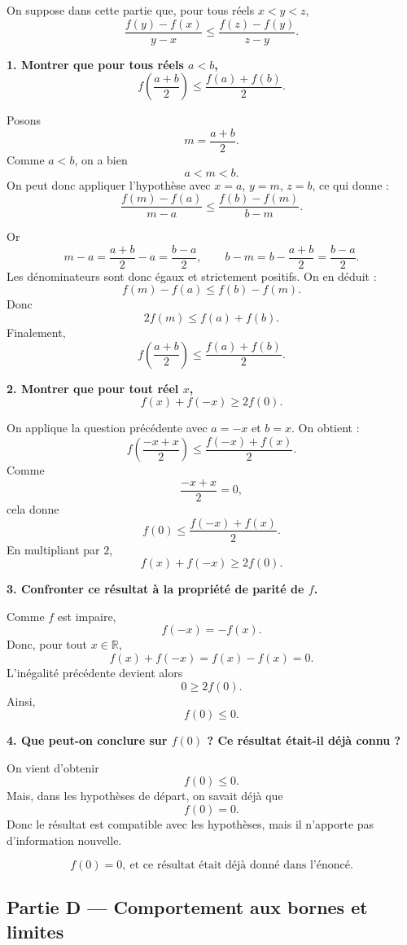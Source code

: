 \documentclass[11pt,a4paper]{article}
\newcommand{\R}{\mathbb{R}}
\begin{document}
On suppose dans cette partie que, pour tous réels \(x<y<z\),
\[
\frac{f(y)-f(x)}{y-x}\le \frac{f(z)-f(y)}{z-y}.
\]

\textbf{1. Montrer que pour tous réels \(a<b\),}
\[
f\!\left(\frac{a+b}{2}\right)\le \frac{f(a)+f(b)}{2}.
\]

Posons
\[
m=\frac{a+b}{2}.
\]
Comme \(a<b\), on a bien
\[
a<m<b.
\]
On peut donc appliquer l'hypothèse avec \(x=a\), \(y=m\), \(z=b\), ce qui donne :
\[
\frac{f(m)-f(a)}{m-a}\le \frac{f(b)-f(m)}{b-m}.
\]

Or
\[
m-a=\frac{a+b}{2}-a=\frac{b-a}{2},
\qquad
b-m=b-\frac{a+b}{2}=\frac{b-a}{2}.
\]
Les dénominateurs sont donc égaux et strictement positifs. On en déduit :
\[
f(m)-f(a)\le f(b)-f(m).
\]
Donc
\[
2f(m)\le f(a)+f(b).
\]
Finalement,
\[
\boxed{f\!\left(\frac{a+b}{2}\right)\le \frac{f(a)+f(b)}{2}.}
\]

\bigskip

\textbf{2. Montrer que pour tout réel \(x\),}
\[
f(x)+f(-x)\ge 2f(0).
\]

On applique la question précédente avec \(a=-x\) et \(b=x\). On obtient :
\[
f\!\left(\frac{-x+x}{2}\right)\le \frac{f(-x)+f(x)}{2}.
\]
Comme
\[
\frac{-x+x}{2}=0,
\]
cela donne
\[
f(0)\le \frac{f(-x)+f(x)}{2}.
\]
En multipliant par \(2\),
\[
\boxed{f(x)+f(-x)\ge 2f(0).}
\]

\bigskip

\textbf{3. Confronter ce résultat à la propriété de parité de \(f\).}

Comme \(f\) est impaire,
\[
f(-x)=-f(x).
\]
Donc, pour tout \(x\in\R\),
\[
f(x)+f(-x)=f(x)-f(x)=0.
\]
L'inégalité précédente devient alors
\[
0\ge 2f(0).
\]
Ainsi,
\[
\boxed{f(0)\le 0.}
\]

\bigskip

\textbf{4. Que peut-on conclure sur \(f(0)\) ? Ce résultat était-il déjà connu ?}

On vient d'obtenir
\[
f(0)\le 0.
\]
Mais, dans les hypothèses de départ, on savait déjà que
\[
f(0)=0.
\]
Donc le résultat est compatible avec les hypothèses, mais il n'apporte pas d'information nouvelle.

\[
\boxed{f(0)=0,\ \text{et ce résultat était déjà donné dans l'énoncé.}}
\]

\bigskip

\subsection*{Partie D --- Comportement aux bornes et limites}
\end{document}
